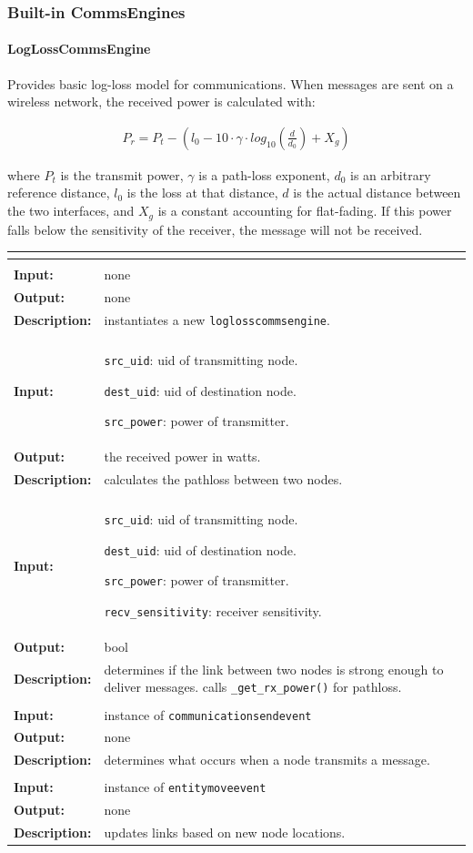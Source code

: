 \documentclass[titlepage]{article}
\renewenvironment{itemize*}
    {\begin{itemize}
        \setlength{\itemsep}{0pt}%
        \setlength{\parskip}{0pt}%
        \setlength{\partopsep}{0pt}%
        \setlength{\topsep}{0pt}}%
    {\end{itemize}}
\newcommand{\operations}[1]{
\begin{center}
    \begin{longtable}{|p{4cm}|p{10cm + 2.0\tabcolsep}|}
    \hline
    \multicolumn{2}{|l|}{\cellcolor[gray]{0.5}{\textbf{Operations}}} \\ \hline
#1
    \end{longtable}
\end{center}
}
\newcommand{\operation}[4]{
    \hline
    \multicolumn{2}{|l|}{\cellcolor[gray]{0.8}{\texttt{#1}}} \\ \hline
    \hspace{7pt}\textbf{Input:} & #2 \\ \hline
    \hspace{7pt}\textbf{Output:} & #3 \\ \hline
    \hspace{7pt}\textbf{Description:} & #4 \\ \hline
}
\begin{document}
\subsubsection{Built-in CommsEngines}
\paragraph{LogLossCommsEngine}{Provides basic log-loss model for communications.  When messages are sent on a wireless network, the received power is calculated with:

\begin{align*}
    P_r = P_t - \left(l_0 - 10 \cdot \gamma \cdot log_{10}\left(\frac{d}{d_0}\right) + X_g\right)
\end{align*}

where $P_t$ is the transmit power, $\gamma$ is a path-loss exponent, $d_0$ is an arbitrary reference distance, $l_0$ is the loss at that distance, $d$ is the actual distance between the two interfaces, and $X_g$ is a constant accounting for flat-fading.  If this power falls below the sensitivity of the receiver, the message will not be received.}

\operations
{
    \operation{\_\_init\_\_()}{none}{none}{instantiates a new \texttt{loglosscommsengine}.}
    \operation{\_get\_rx\_power(src\_uid, dest\_uid, src\_power}{
        \begin{itemize*}
            \item \texttt{src\_uid}: uid of transmitting node.
            \item \texttt{dest\_uid}: uid of destination node.
            \item \texttt{src\_power}: power of transmitter.
        \end{itemize*}}{the received power in watts.}{calculates the pathloss between two nodes.}
    \operation{\_should\_deliver(src\_uid, dest\_uid, src\_power, recv\_sensitivity)}{
        \begin{itemize*}
            \item \texttt{src\_uid}: uid of transmitting node.
            \item \texttt{dest\_uid}: uid of destination node.
            \item \texttt{src\_power}: power of transmitter.
            \item \texttt{recv\_sensitivity}: receiver sensitivity.
        \end{itemize*}}{bool}{determines if the link between two nodes is strong enough to deliver messages.  calls \texttt{\_get\_rx\_power()} for pathloss.}
    \operation{\_on\_send(event)}{instance of \texttt{communicationsendevent}}{none}{determines what occurs when a node transmits a message.}
    \operation{\_on\_movement(event)}{instance of \texttt{entitymoveevent}}{none}{updates links based on new node locations.}
}
\end{document}
